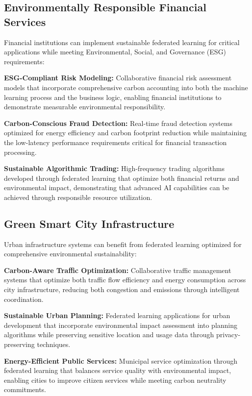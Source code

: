 \documentclass[10pt,journal,compsoc]{IEEEtran}
\begin{document}
\subsection{Environmentally Responsible Financial Services}

Financial institutions can implement sustainable federated learning for critical applications while meeting Environmental, Social, and Governance (ESG) requirements:

\textbf{ESG-Compliant Risk Modeling:} Collaborative financial risk assessment models that incorporate comprehensive carbon accounting into both the machine learning process and the business logic, enabling financial institutions to demonstrate measurable environmental responsibility.

\textbf{Carbon-Conscious Fraud Detection:} Real-time fraud detection systems optimized for energy efficiency and carbon footprint reduction while maintaining the low-latency performance requirements critical for financial transaction processing.

\textbf{Sustainable Algorithmic Trading:} High-frequency trading algorithms developed through federated learning that optimize both financial returns and environmental impact, demonstrating that advanced AI capabilities can be achieved through responsible resource utilization.

\subsection{Green Smart City Infrastructure}

Urban infrastructure systems can benefit from federated learning optimized for comprehensive environmental sustainability:

\textbf{Carbon-Aware Traffic Optimization:} Collaborative traffic management systems that optimize both traffic flow efficiency and energy consumption across city infrastructure, reducing both congestion and emissions through intelligent coordination.

\textbf{Sustainable Urban Planning:} Federated learning applications for urban development that incorporate environmental impact assessment into planning algorithms while preserving sensitive location and usage data through privacy-preserving techniques.

\textbf{Energy-Efficient Public Services:} Municipal service optimization through federated learning that balances service quality with environmental impact, enabling cities to improve citizen services while meeting carbon neutrality commitments.
\end{document}
